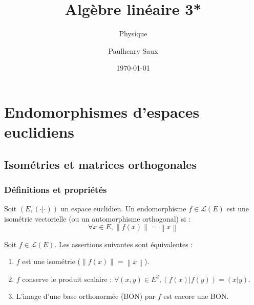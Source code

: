 \documentclass[french]{yLectureNote}
\title{Algèbre linéaire 3*}
\subtitle{Physique}
\author{Paulhenry Saux}
\date{\today}
\newcommand{\norm}[1]{\left\|#1\right\|}
\newcommand{\ps}[2]{(#1|#2)}
\begin{document}
\setcounter{chapter}{1}


\chapter{Endomorphismes d'espaces euclidiens}

\section{Isométries et matrices orthogonales}

\subsection{Définitions et propriétés}

\begin{definition}
    Soit $(E, \ps{\cdot}{\cdot})$ un espace euclidien. Un endomorphisme $f \in \mathcal{L}(E)$ est une isométrie vectorielle (ou un automorphisme orthogonal) si :
    $$\forall x \in E, \norm{f(x)} = \norm{x}$$
\end{definition}

\begin{proposition}
    Soit $f \in \mathcal{L}(E)$. Les assertions suivantes sont équivalentes :
    \begin{enumerate}
        \item $f$ est une isométrie ($\norm{f(x)} = \norm{x}$).
        \item $f$ conserve le produit scalaire : $\forall (x,y) \in E^2, \ps{f(x)}{f(y)} = \ps{x}{y}$.
        \item L'image d'une base orthonormée (BON) par $f$ est encore une BON.
    \end{enumerate}
\end{proposition}
\end{document}
